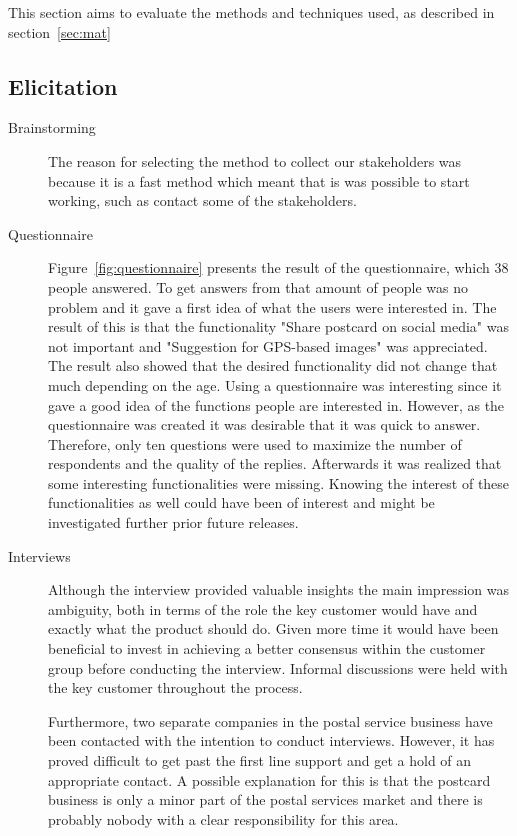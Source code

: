 \documentclass[10pt,a4paper]{article}
\begin{document}
This section aims to evaluate the methods and techniques used, as described in section~\ref{sec:mat}
\subsection{Elicitation}
\begin{description}
\item[Brainstorming]The reason for selecting the method to collect our stakeholders was because it is a fast method which meant that is was possible to start working, such as contact some of the stakeholders. 

\item[Questionnaire] Figure~\ref{fig:questionnaire} presents the result of the questionnaire, which 38 people answered. To get answers from that amount of people was no problem and it gave a first idea of what the users were interested in. The result of this is that the functionality "Share postcard on social media" was not important and "Suggestion for GPS-based images" was appreciated. The result also showed that the desired functionality did not change that much depending on the age. Using a questionnaire was interesting since it gave a good idea of the functions people are interested in. However, as the questionnaire  was created it was desirable that it was quick to answer. Therefore, only ten questions were used to maximize the number of respondents and the quality of the replies. Afterwards it was realized that some interesting functionalities were missing. Knowing the interest of these functionalities as well could have been of interest and might be investigated further prior future releases.

\item[Interviews] Although the interview provided valuable insights the main impression was ambiguity, both in terms of the role the key customer would have and exactly what the product should do. Given more time it would have been beneficial to invest in achieving a better consensus within the customer group before conducting the interview. Informal discussions were held with the key customer throughout the process.

Furthermore, two separate companies in the postal service business have been contacted with the intention to conduct interviews. However, it has proved difficult to get past the first line support and get a hold of an appropriate contact. A possible explanation for this is that the postcard business is only a minor part of the postal services market and there is probably nobody with a clear responsibility for this area.  


\end{description}
\end{document}
